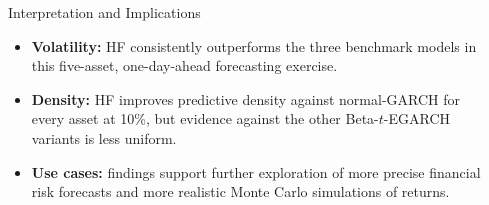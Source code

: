 \documentclass[final]{beamer}
\newlength{\sepwidth}
\newlength{\colwidth}
\newcommand{\separatorcolumn}{
    \begin{column}{\sepwidth}
    \end{column}
}
\begin{document}
\begin{frame}[t]
\begin{columns}[t]
\begin{column}{\colwidth}
\begin{alertblock}{Interpretation and Implications}
\begin{itemize}
 \setlength{\itemsep}{0.16cm}
 \item \textbf{Volatility:} HF consistently outperforms the three benchmark models in this five-asset, one-day-ahead forecasting exercise.
 \item \textbf{Density:} HF improves predictive density against normal-GARCH for every asset at 10\%, but evidence against the other Beta-$t$-EGARCH variants is less uniform.
 \item \textbf{Use cases:} findings support further exploration of more precise financial risk forecasts and more realistic Monte Carlo simulations of returns.
\end{itemize}
\end{alertblock}

\end{column}


\separatorcolumn
\end{columns}
\end{frame}
\end{document}
